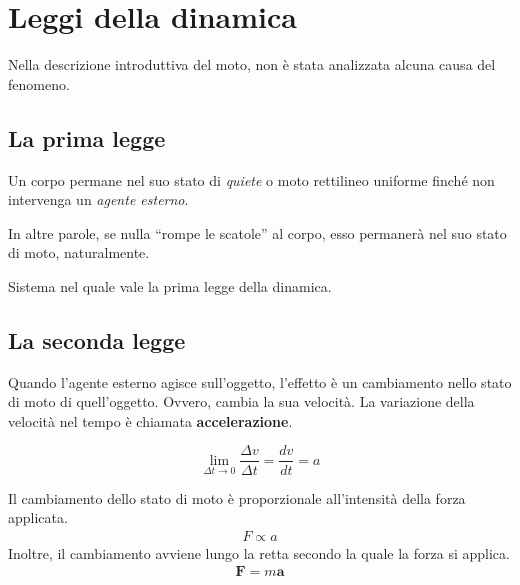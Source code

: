 \marginpar{\minitoc}

\section{Leggi della dinamica}

Nella descrizione introduttiva del moto, non è stata analizzata alcuna causa del
fenomeno.

\subsection{La prima legge}

\vspace{8pt}
\begin{tcolorbox}[colback = red!30, colframe = red!30!black, title = {Prima legge della dinamica (legge di inerzia)}]
    Un corpo permane nel suo stato di \textit{quiete} o moto rettilineo uniforme
    finché non intervenga un \textit{agente esterno}.
\end{tcolorbox}
\vspace{5pt}

In altre parole, se nulla ``rompe le scatole'' al corpo, esso permanerà nel suo
stato di moto, naturalmente.

\vspace{8pt}
\begin{tcolorbox}[colback = yellow!30, colframe = yellow!30!black, title = {Sistema inerziale}]
    Sistema nel quale vale la prima legge della dinamica.
\end{tcolorbox}
\vspace{5pt}

\subsection{La seconda legge}
Quando l'agente esterno agisce sull'oggetto, l'effetto è un cambiamento nello
stato di moto di quell'oggetto. Ovvero, cambia la sua velocità. La variazione
della velocità nel tempo è chiamata \textbf{accelerazione}.

\[ \lim_{\Delta t \to 0} \frac{\Delta v}{\Delta t} = \frac{dv}{dt} = a \]

\vspace{8pt}
\begin{tcolorbox}[colback = red!30, colframe = red!30!black, title = {Seconda legge della dinamica}]
Il cambiamento dello stato di moto è proporzionale all'intensità della forza applicata.
    \begin{align}
        F \propto a
    \end{align}
Inoltre, il cambiamento avviene lungo la retta secondo la quale la forza
si applica.
    \begin{align}
        \mathbf{F} = m \mathbf{a}
    \end{align}
\end{tcolorbox}
\vspace{5pt}


